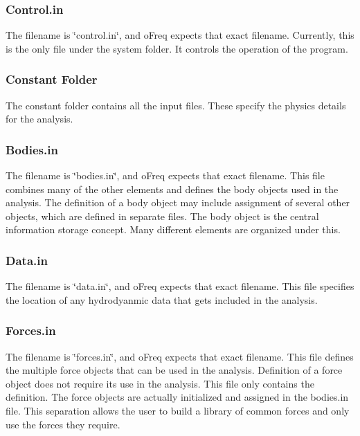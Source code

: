 \subsubsection*{Control.\-in}

The filename is \char`\"{}control.\-in\char`\"{}, and o\-Freq expects that exact filename. Currently, this is the only file under the system folder. It controls the operation of the program.\hypertarget{directory_structure_constant1}{}\subsubsection{Constant Folder}\label{directory_structure_constant1}
The constant folder contains all the input files. These specify the physics details for the analysis.

\subsubsection*{Bodies.\-in}

The filename is \char`\"{}bodies.\-in\char`\"{}, and o\-Freq expects that exact filename. This file combines many of the other elements and defines the body objects used in the analysis. The definition of a body object may include assignment of several other objects, which are defined in separate files. The body object is the central information storage concept. Many different elements are organized under this.

\subsubsection*{Data.\-in}

The filename is \char`\"{}data.\-in\char`\"{}, and o\-Freq expects that exact filename. This file specifies the location of any hydrodyanmic data that gets included in the analysis.

\subsubsection*{Forces.\-in}

The filename is \char`\"{}forces.\-in\char`\"{}, and o\-Freq expects that exact filename. This file defines the multiple force objects that can be used in the analysis. Definition of a force object does not require its use in the analysis. This file only contains the definition. The force objects are actually initialized and assigned in the bodies.\-in file. This separation allows the user to build a library of common forces and only use the forces they require.

